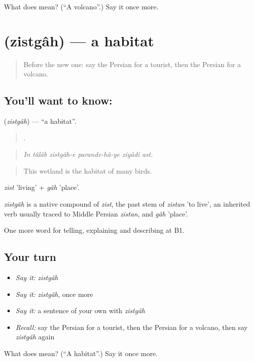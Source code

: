 \begin{tcolorbox}[breakable,colback=teal!4,colframe=teal!35!black,title={Before you move on}]
What does  mean? (\textquotedblleft{}A volcano\textquotedblright{}.) Say it once more.
\end{tcolorbox}
\section[\texorpdfstring{\fa{زیستگاه} (zistgâh)}{زیستگاه (zistgâh)}]{ (zistgâh) — a habitat}

\label{lesson:FA-C472-zistgah}



\begin{quote}
Before the new one: say the Persian for a tourist, then the Persian for a volcano.
\end{quote}

\subsection*{You'll want to know: }
\textbf{} (\emph{zistgâh}) — \textquotedblleft{}a habitat\textquotedblright{}.

\begin{quote}
      .
\end{quote}

\begin{quote}
\emph{In tâlâb zistgâh-e parande-hâ-ye ziyâdi ast.}
\end{quote}

\begin{quote}
This wetland is the habitat of many birds.
\end{quote}

\emph{zist} 'living' + \emph{gâh} 'place'.

\begin{cousinweb}
\emph{zistgâh} is a native compound of \emph{zist}, the past stem of \emph{zistan} 'to live', an inherited verb usually traced to Middle Persian \emph{zīstan}, and \emph{gâh} 'place'.
\end{cousinweb}

\begin{grammarlens}[title={What you've built}]
One more word for telling, explaining and describing at B1.
\end{grammarlens}

\subsection*{Your turn}
\begin{itemize}
\raggedright
  \item \emph{Say it:} \emph{zistgâh}
  \item \emph{Say it:} \emph{zistgâh}, once more
  \item \emph{Say it:} a sentence of your own with \emph{zistgâh}
  \item \emph{Recall:} say the Persian for a tourist, then the Persian for a volcano, then say \emph{zistgâh} again
\end{itemize}

\begin{tcolorbox}[breakable,colback=teal!4,colframe=teal!35!black,title={Before you move on}]
What does  mean? (\textquotedblleft{}A habitat\textquotedblright{}.) Say it once more.
\end{tcolorbox}
